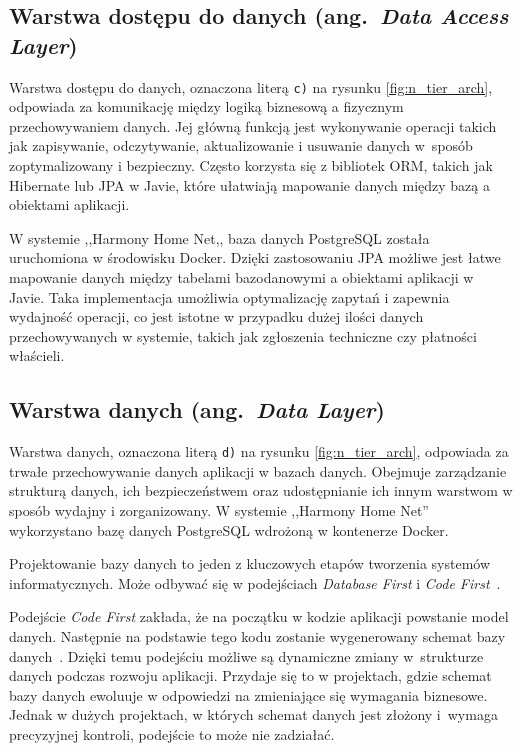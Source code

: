 \subsection{Warstwa dostępu do danych (ang.\ \emph{Data Access Layer})}

Warstwa dostępu do danych, oznaczona literą \texttt{c)} na rysunku \ref{fig:n_tier_arch}, odpowiada za komunikację między logiką biznesową a fizycznym przechowywaniem danych. Jej główną funkcją jest wykonywanie operacji takich jak zapisywanie, odczytywanie, aktualizowanie i usuwanie danych w~sposób zoptymalizowany i bezpieczny. Często korzysta się z bibliotek ORM, takich jak Hibernate lub JPA w Javie, które ułatwiają mapowanie danych między bazą a obiektami aplikacji.

W systemie ,,Harmony Home Net,, baza danych PostgreSQL została uruchomiona w środowisku Docker. Dzięki zastosowaniu JPA możliwe jest łatwe mapowanie danych między tabelami bazodanowymi a obiektami aplikacji w Javie. Taka implementacja umożliwia optymalizację zapytań i zapewnia wydajność operacji, co jest istotne w przypadku dużej ilości danych przechowywanych w systemie, takich jak zgłoszenia techniczne czy płatności właścieli.

\subsection{Warstwa danych (ang.\ \emph{Data Layer})}
Warstwa danych, oznaczona literą \texttt{d)} na rysunku \ref{fig:n_tier_arch}, odpowiada za trwałe przechowywanie danych aplikacji w bazach danych. Obejmuje zarządzanie strukturą danych, ich bezpieczeństwem oraz udostępnianie ich innym warstwom w sposób wydajny i zorganizowany. W systemie ,,Harmony Home Net'' wykorzystano bazę danych PostgreSQL wdrożoną w kontenerze Docker. 

Projektowanie bazy danych to jeden z kluczowych etapów tworzenia systemów informatycznych. Może odbywać się w podejściach \emph{Database First} i \emph{Code First}~\cite{DB_FIRST_VS_CODE_FIRST_1,DB_FIRST_VS_CODE_FIRST_2}. 

Podejście \emph{Code First} zakłada, że na początku w kodzie aplikacji powstanie model danych. Następnie na podstawie tego kodu zostanie wygenerowany schemat bazy danych~\cite{CODE_FIRST}. Dzięki temu podejściu możliwe są dynamiczne zmiany w~strukturze danych podczas rozwoju aplikacji. Przydaje się to w projektach, gdzie schemat bazy danych ewoluuje w odpowiedzi na zmieniające się wymagania biznesowe. Jednak w dużych projektach, w których schemat danych jest złożony i~wymaga precyzyjnej kontroli, podejście to może nie zadziałać.

